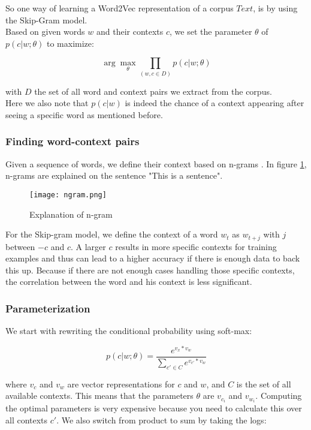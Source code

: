 So one way of learning a Word2Vec representation of a corpus $Text$, is by using the Skip-Gram model. \\
Based on given words $w$ and their contexts $c$, we set the parameter $\theta$ of $p(c|w;\theta)$ to maximize:

\begin{equation} 
\arg \max_{\theta} \prod_{(w,c \in D)} p(c|w;\theta)
\end{equation}

\noindent with $D$ the set of all word and context pairs we extract from the corpus.\\
Here we also note that $p(c|w)$ is indeed the chance of a context appearing after seeing a specific word as mentioned before.

\subsubsection{Finding word-context pairs}

Given a sequence of words, we define their context based on n-grams \cite{w2vNgram:article}. In figure \ref{fig:ngram}, n-grams are explained on the sentence "This is a sentence". 

\begin{figure}[htbp]
	\centering
	\texttt{[image: ngram.png]}
	\caption{Explanation of n-gram \cite{w2vNgram:online}}
	\label{fig:ngram}
\end{figure} 

For the Skip-gram model, we define the context of a word $w_t$ as $w_{t+j}$ with $j$ between $-c$ and $c$. A larger $c$ results in more specific contexts for training examples and thus can lead to a higher accuracy if there is enough data to back this up. Because if there are not enough cases handling those specific contexts, the correlation between the word and his context is less significant.


\subsubsection{Parameterization}

We start with rewriting the conditional probability using soft-max:

\begin{equation} 
p(c|w;\theta) = \frac{e^{v_x*v_w}}{\sum_{c' \in C}e^{v_{c'}*v_w}}
\end{equation}

\noindent where $v_c$ and $v_w$ are vector representations for $c$ and $w$, and $C$ is the set of all available contexts. This means that the parameters $\theta$ are $v_{c_i}$ and $v_{w_i}$. Computing the optimal parameters is very expensive because you need to calculate this over all contexts $c'$. We also switch from product to sum by taking the logs:

